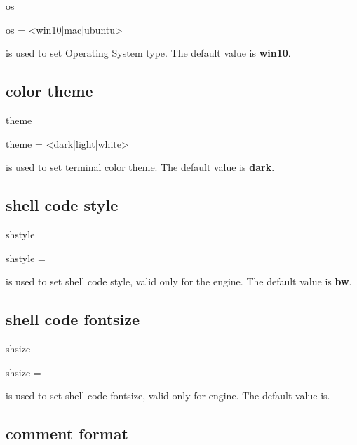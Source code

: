 \documentclass{ctxdoc}
\begin{document}
 \begin{function}[added=2021-12-18,updated=2021-12-18]{os}
   \begin{syntax}
     os =  <win10|mac|ubuntu> 
   \end{syntax}
    is used to set Operating System type. The default value is \textbf{win10}.
 \end{function}

 \subsection{color theme}

 \begin{function}[added=2021-12-18,updated=2021-12-18]{theme}
   \begin{syntax}
     theme =  <dark|light|white> 
   \end{syntax}
    is used to set terminal color theme. The default value is \textbf{dark}.
 \end{function}

 \subsection{shell code style}

 \begin{function}[added=2021-12-18,updated=2021-12-18]{shstyle}
   \begin{syntax}
     shstyle =  
   \end{syntax}
    is used to set shell code style, valid only for the  engine.
   The default value is \textbf{bw}.
 \end{function}

 \subsection{shell code fontsize}

 \begin{function}[added=2021-12-18,updated=2021-12-18]{shsize}
   \begin{syntax}
     shsize =  \init{\small}
   \end{syntax}
    is used to set shell code fontsize, valid only for  engine.
   The default value is\textbf{}.
 \end{function}

 \subsection{comment format}
\end{document}
